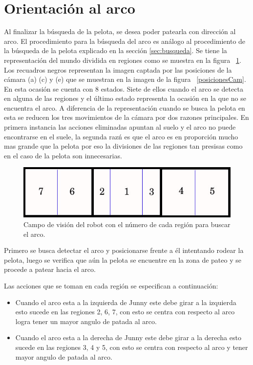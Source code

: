 \section{Orientaci\'on al arco}

Al finalizar la búsqueda de la pelota, se desea poder patearla con dirección al arco. El procedimiento para la búsqueda del arco es an\'alogo al procedimiento de la b\'usqueda de la pelota explicado en la sección \ref{sec:busqueda}.
Se tiene la representación del mundo dividida en regiones como se muestra en la figura ~\ref{divisionCamArco}. Los recuadros negros representan la imagen captada por las posiciones de la cámara (a) (c) y (e) que se muestran en la imagen de la figura ~\ref{posicionesCam}. En esta ocasi\'on se cuenta con 8 estados. Siete de ellos cuando el arco se detecta en alguna de las regiones y el último estado representa la ocasión en la que no se encuentra el arco. 
A diferencia de la representaci\'on cuando se busca la pelota en esta se reducen los tres movimientos de la c\'amara por dos razones principales. En primera instancia las acciones eliminadas apuntan al suelo y el arco no puede encontrarse en el suele, la segunda raz\'n es que el arco es en proporci\'on mucho mas grande que la pelota por eso la divisiones de las regiones tan presisas como en el caso de la pelota son innecesarias.
\begin{figure}[hbtp]
\centering
\includegraphics[scale=0.5]{imagenes/RegionesArco.jpg}
\caption{Campo de visión del robot con el número de cada región para buscar el arco. }
\label{divisionCamArco}
\end{figure}

Primero se busca detectar el arco y posicionarse frente a él intentando rodear la pelota, luego se verifica que a\'un la pelota se encuentre en la zona de pateo y se procede a patear hacia el arco.

Las acciones que se toman en cada regi\'on se especifican a continuación: 
 \begin{itemize}

\item Cuando el arco esta a la izquierda de Junny este debe girar a la izquierda esto sucede en las regiones 2, 6, 7, con esto se centra con respecto al arco logra tener un mayor angulo de patada al arco.

\item Cuando el arco esta a la derecha de Junny este debe girar a la derecha esto sucede en las regiones 3, 4 y 5, con esto se centra con respecto al arco y tener mayor angulo de patada al arco.


\end{itemize}

